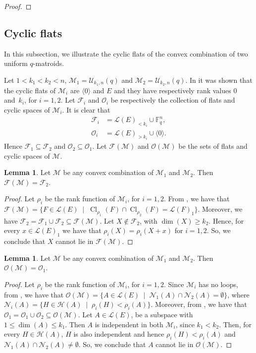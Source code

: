 \documentclass[a4paper,11pt,reqno]{amsart}
\theoremstyle{definition}
\newtheorem{lemma}[theorem]{{{Lemma}}}
\newcommand{\mM}{\mathcal{M}}
\newcommand{\mL}{\mathcal{L}}
\newcommand{\mU}{\mathcal{U}}
\newcommand{\mF}{\mathcal{F}}
\newcommand{\mO}{\mathcal{O}}
\newcommand{\mN}{\mathcal{N}}
\newcommand{\mH}{\mathcal{H}}
\newcommand{\F}{\mathbb F}
\DeclareMathOperator{\Cl}{Cl}
\begin{document}
{\begin{proof}
\end{proof}

\subsection{Cyclic flats}

In this subsection, we illustrate the cyclic flats of the convex combination of two uniform $q$-matroids.

Let $1< k_1<k_2<n$, $\mM_1=\mU_{k_1,n}(q)$ and $\mM_2=\mU_{k_2,n}(q)$. In \cite[Proposition 3.30]{alfarano2024cyclic} it was shown that the cyclic flats of $\mM_i$ are $\langle 0 \rangle$ and $E$ and they have respectively rank values $0$ and~$k_i$, for $i=1,2$. Let $\mF_i$ and $\mO_i$ be respectively the collection of flats and cyclic spaces of $\mM_i$. 
It is clear that 
\begin{align*}
    \mF_i &= \mL(E)_{< k_i} \cup \F_q^n, \\
    \mO_i &= \mL(E)_{>k_i}\cup\langle 0 \rangle.
\end{align*}
Hence $\mF_1\subseteq \mF_2$ and $\mO_2\subseteq \mO_1$.
Let $\mF(\mM)$ and $\mO(\mM)$ be the sets of flats and cyclic spaces of $\mM$. 

\begin{lemma}\label{lem:flats_uniform}
    Let $\mM$ be any convex combination of $\mM_1$ and $\mM_2$. Then $\mF(\mM)=\mF_2$.
\end{lemma}
\begin{proof}
    Let $\rho_i$ be the rank function of $\mM_i$, for $i=1,2$. From , we have that $\mF(\mM)=\{F\in\mL(E) \; \mid \; \Cl_{\rho_1}(F) \cap\Cl_{\rho_2}(F)  = \mL(F)_1\}$. Moreover, we have  $\mF_2 = \mF_1\cup \mF_2 \subseteq \mF(\mM)$. Let $X\notin \mF_2$, with $\dim(X)\geq k_2$. Hence, for every $x\in \mL(E)_1$ we have that $\rho_i(X) = \rho_i(X+x)$ for $i=1,2$. So, we conclude that $X$ cannot lie in $\mF(\mM)$.
\end{proof}

\begin{lemma}\label{lem:cyclic_uniform}
    Let $\mM$ be any convex combination of $\mM_1$ and $\mM_2$. Then $\mO(\mM)=\mO_1$.
\end{lemma}
\begin{proof}
    Let $\rho_i$ be the rank function of $\mM_i$, for $i=1,2$. Since $\mM_i$ has no loops, from , we have that $\mO(\mM)=\{A\in\mL(E) \; \mid \; \mN_1(A)\cap \mN_2(A)=\emptyset\}$, where $\mN_i(A)=\{H\in\mH(A) \; \mid \; \rho_i(H)<\rho_i(A)\}$. Moreover, from , we have that $\mO_1 = \mO_1\cup \mO_2 \subseteq \mO(\mM)$.  Let $A\in\mL(E)$, be a subspace with $1\leq \dim(A)\leq k_1$. Then $A$ is independent in both $\mM_i$, since $ k_1<k_2$. Then, for every $H\in\mH(A)$, $H$ is also independent and hence $\rho_i(H)<\rho_i(A)$ and $\mN_1(A) \cap \mN_2(A) \ne \emptyset$. So, we conclude that $A$ cannot lie in $\mO(\mM)$. 
\end{proof}

}
\end{document}
